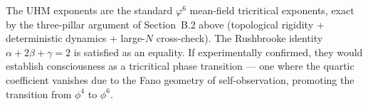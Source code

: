 The UHM exponents are the standard $\varphi^6$ mean-field tricritical exponents, exact by the
three-pillar argument of Section~B.2 above (topological rigidity + deterministic dynamics
+ large-$N$ cross-check). The Rushbrooke identity $\alpha + 2\beta + \gamma = 2$
is satisfied as an equality. If experimentally confirmed, they would establish consciousness
as a tricritical phase transition --- one where the quartic coefficient vanishes due to the
Fano geometry of self-observation, promoting the transition from $\phi^4$ to $\phi^6$.
